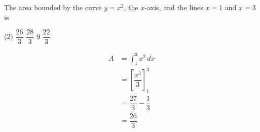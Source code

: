 
\item The area bounded by the curve $y = x^2$, the $x$-axis, and the lines $x = 1$ and $x = 3$ is

\begin{center}
    
\end{center}

\begin{tasks}(2)
    \task $\dfrac{26}{3}$ \ans
    \task $\dfrac{28}{3}$
    \task $9$
    \task $\dfrac{22}{3}$
\end{tasks}

\begin{solution}
\begin{align*}
A &= \int_{1}^{3} x^2 \, dx \\
    &= \left[\dfrac{x^3}{3}\right]_{1}^{3} \\
    &= \dfrac{27}{3} - \dfrac{1}{3} \\
    &= \dfrac{26}{3}
\end{align*}
\end{solution}
